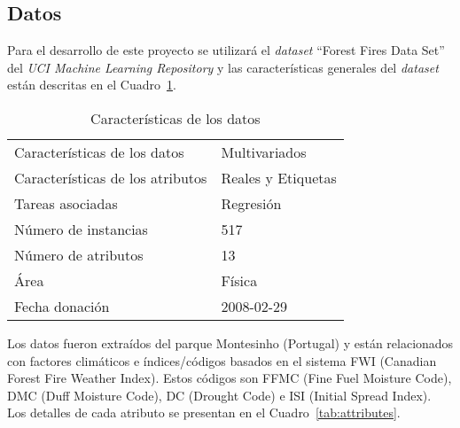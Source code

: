 \documentclass[spanish]{article}
\begin{document}
    	\subsection{Datos}
        
        	Para el desarrollo de este proyecto se utilizará el \emph{dataset} ``Forest Fires Data Set'' del 
            \emph{UCI Machine Learning Repository} \cite{cortez} y las características generales del \emph{dataset} están descritas 
            en el Cuadro~\ref{tab:features}.
            
            \clearpage
            
            \begin{table}[!ht]
            	\centering            
                \caption{Características de los datos}
      	      	\begin{tabular}{ll} 
                	\hline
                	Características de los datos & Multivariados \\              			    				
                    Características de los atributos & Reales y Etiquetas \\
                    Tareas asociadas & Regresión \\
                    Número de instancias & 517 \\
                    Número de atributos & 13 \\
                    Área & Física \\
                    Fecha donación & 2008-02-29 \\
                    \hline
            	\end{tabular}            
                \label{tab:features}
            \end{table}
            
            Los datos fueron extraídos del parque Montesinho (Portugal) y están relacionados con factores climáticos 
            e índices/códigos basados en el sistema FWI (Canadian Forest Fire Weather Index). Estos códigos son
            FFMC (Fine Fuel Moisture Code), DMC (Duff Moisture Code), DC (Drought Code) e ISI (Initial Spread Index).
            Los detalles de cada atributo se presentan en el Cuadro~\ref{tab:attributes}.
            
\end{document}
